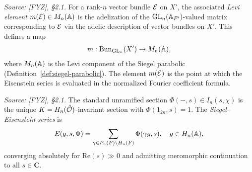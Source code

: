 \begin{definition}
  \label{def:levi-element-map}
  \textit{Source: [FYZ], \S2.1.}
  For a rank-\(n\) vector bundle \(\mathcal{E}\) on \(X'\), the associated \emph{Levi element}
  \(m(\mathcal{E}) \in M_n(\mathbb{A})\) is the adelization of the \(\operatorname{GL}_n(\mathbb{A}_{F'})\)-valued matrix
  corresponding to \(\mathcal{E}\) via the adelic description of vector bundles on \(X'\). This
  defines a map
  \[
    m : \operatorname{Bun}_{\operatorname{GL}_n}(X') \to M_n(\mathbb{A}),
  \]
  where \(M_n(\mathbb{A})\) is the Levi component of the Siegel parabolic
  (Definition~\ref{def:siegel-parabolic}). The element \(m(\mathcal{E})\) is the point at which
  the Eisenstein series is evaluated in the normalized Fourier coefficient formula.
\end{definition}

\begin{definition}
  \label{def:siegel-eisenstein-series}
  \textit{Source: [FYZ], \S2.1.}
  The standard unramified section \(\Phi(-,s) \in I_n(s, \chi)\) is the unique
  \(K = H_n(\hat{\mathcal{O}})\)-invariant section with \(\Phi(1_{2n}, s) = 1\). The
  \emph{Siegel--Eisenstein series} is
  \[
    E(g, s, \Phi) = \sum_{\gamma \in P_n(F) \backslash H_n(F)} \Phi(\gamma g, s),
    \quad g \in H_n(\mathbb{A}),
  \]
  converging absolutely for \(\mathrm{Re}(s) \gg 0\) and admitting meromorphic
  continuation to all \(s \in \mathbf{C}\).
\end{definition}

